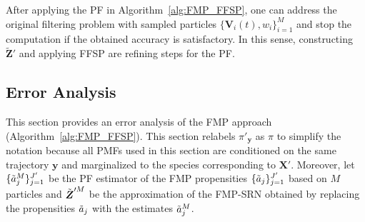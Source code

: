 \begin{remark}
\label{remark:FMP_PF_refining}
    After applying the \ac{PF} in Algorithm~\ref{alg:FMP_FFSP}, one can address the original filtering problem with sampled particles $\{ \boldsymbol{V}_i(t), w_i \}_{i=1}^{M}$ and stop the computation if the obtained accuracy is satisfactory. In this sense, constructing $\tilde{\boldsymbol{Z}}'$ and applying \ac{FFSP} are refining steps for the \ac{PF}. 
\end{remark}






\subsection{Error Analysis}
\label{subsec:FMP_error_analysis}

This section provides an error analysis of the \ac{FMP} approach (Algorithm~\ref{alg:FMP_FFSP}). This section relabels $\pi'_{\boldsymbol{y}}$ as $\pi$ to simplify the notation because all \acp{PMF} used in this section are conditioned on the same trajectory $\boldsymbol{y}$ and marginalized to the species corresponding to $\boldsymbol{X}'$. Moreover, let $\{ \Tilde{a}_j^M \}_{j=1}^{J'}$ be the \ac{PF} estimator of the \ac{FMP} propensities $\{ \Tilde{a}_j \}_{j=1}^{J'}$ based on $M$ particles and $\Tilde{\boldsymbol{Z}}'^M$ be the approximation of the \ac{FMP}-\ac{SRN} obtained by replacing the propensities $\Tilde{a}_j$ with the estimates $\Tilde{a}_j^M$. 

